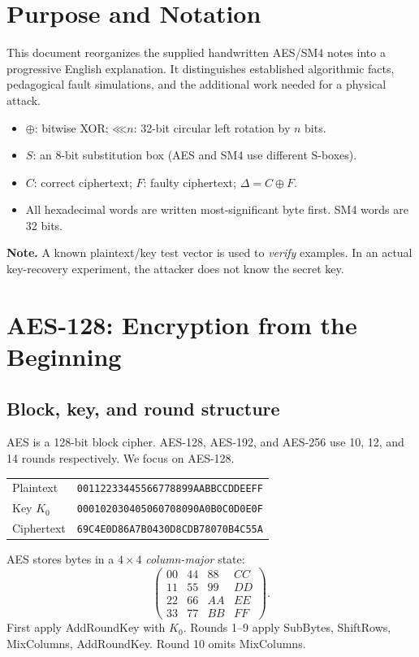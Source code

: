 \documentclass[11pt,a4paper]{report}
\newcommand{\hex}[1]{\texttt{#1}}
\newcommand{\xor}{\mathbin{\oplus}}
\newcommand{\rol}{\mathbin{\lll}}
\newcommand{\note}[1]{\par\smallskip\noindent\colorbox{pale}{\parbox{0.94\linewidth}{\textbf{Note.} #1}}\par\smallskip}
\begin{document}
\chapter{Purpose and Notation}
This document reorganizes the supplied handwritten AES/SM4 notes into a progressive English explanation. It distinguishes established algorithmic facts, pedagogical fault simulations, and the additional work needed for a physical attack.
\begin{itemize}
\item \(\xor\): bitwise XOR; \(\rol n\): 32-bit circular left rotation by \(n\) bits.
\item \(S\): an 8-bit substitution box (AES and SM4 use different S-boxes).
\item \(C\): correct ciphertext; \(F\): faulty ciphertext; \(\Delta=C\xor F\).
\item All hexadecimal words are written most-significant byte first. SM4 words are 32 bits.
\end{itemize}
\note{A known plaintext/key test vector is used to \emph{verify} examples. In an actual key-recovery experiment, the attacker does not know the secret key.}

\chapter{AES-128: Encryption from the Beginning}
\section{Block, key, and round structure}
AES is a 128-bit block cipher. AES-128, AES-192, and AES-256 use 10, 12, and 14 rounds respectively. We focus on AES-128.
\begin{center}\begin{tabular}{ll}\toprule Plaintext & \hex{00112233445566778899AABBCCDDEEFF}\\Key \(K_0\)&\hex{000102030405060708090A0B0C0D0E0F}\\Ciphertext&\hex{69C4E0D86A7B0430D8CDB78070B4C55A}\\\bottomrule\end{tabular}\end{center}
AES stores bytes in a \(4\times4\) \emph{column-major} state:
\[\begin{pmatrix}00&44&88&CC\\11&55&99&DD\\22&66&AA&EE\\33&77&BB&FF\end{pmatrix}.\]
First apply AddRoundKey with \(K_0\). Rounds 1--9 apply SubBytes, ShiftRows, MixColumns, AddRoundKey. Round 10 omits MixColumns.
\end{document}
